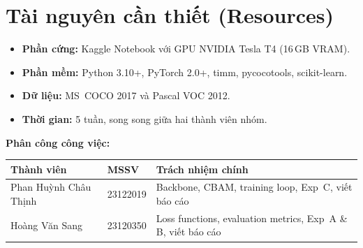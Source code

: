 \documentclass{article}
\begin{document}
\section{Tài nguyên cần thiết (Resources)}

\begin{itemize}[leftmargin=1.8em]
  \item \textbf{Phần cứng:} Kaggle Notebook với GPU NVIDIA Tesla T4 (16\,GB
        VRAM).
  \item \textbf{Phần mềm:} Python 3.10+, PyTorch 2.0+, timm, pycocotools,
        scikit-learn.
  \item \textbf{Dữ liệu:} MS~COCO 2017 và Pascal VOC 2012.
  \item \textbf{Thời gian:} 5 tuần, song song giữa hai thành viên nhóm.
\end{itemize}


\noindent\textbf{Phân công công việc:}

\begin{table}[H]
  \centering
  \small
  \begin{tabular}{lll}
    \toprule
    \textbf{Thành viên} & \textbf{MSSV} & \textbf{Trách nhiệm chính} \\
    \midrule
    Phan Huỳnh Châu Thịnh & 23122019 & Backbone, CBAM, training loop, Exp~C, viết báo cáo \\
    Hoàng Văn Sang & 23120350 & Loss functions, evaluation metrics, Exp~A \& B, viết báo cáo \\
    \bottomrule
  \end{tabular}
\end{table}



\end{document}

